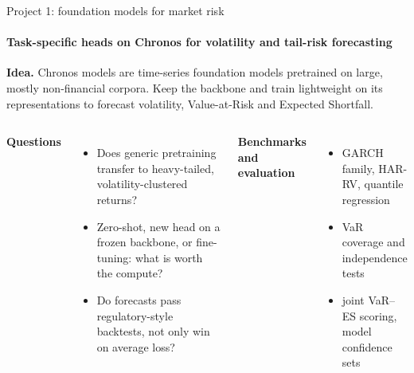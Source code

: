 \documentclass[aspectratio=169,11pt,t]{beamer}
\begin{document}
\begin{frame}{Project 1: foundation models for market risk}
  \framesubtitle{Task-specific heads on Chronos for volatility and tail-risk forecasting}
  \textbf{Idea.} Chronos models are time-series foundation models pretrained on large, mostly
  non-financial corpora. Keep the backbone and train lightweight  on its representations to forecast volatility, Value-at-Risk and Expected Shortfall.

  \smallskip
  \begin{columns}[T,onlytextwidth]
    \textbf{Questions}
    \begin{itemize}\small
      \item Does generic pretraining transfer to heavy-tailed, volatility-clustered returns?
      \item Zero-shot, new head on a frozen backbone, or fine-tuning: what is worth the compute?
      \item Do forecasts pass regulatory-style backtests, not only win on average loss?
    \end{itemize}
    \textbf{Benchmarks and evaluation}
    \begin{itemize}\small
      \item GARCH family, HAR-RV, quantile regression
      \item VaR coverage and independence tests
      \item joint VaR--ES scoring, model confidence sets
    \end{itemize}
  \end{columns}

\end{frame}
\end{document}
